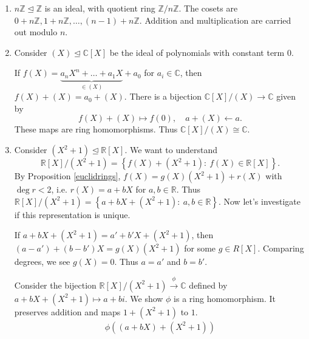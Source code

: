 \documentclass[a4paper]{scrartcl}
\begin{document}
\begin{example*}
       \begin{enumerate}
             \item $n\mathbb{Z} \unlhd \mathbb{Z}$ is an ideal, with quotient ring $\mathbb{Z}/n\mathbb{Z}$. The cosets are $0+n\mathbb{Z}, 1+n\mathbb{Z}, \ldots, (n-1)+n\mathbb{Z}$. Addition and multiplication are carried out modulo $n$.
             \item Consider $(X) \unlhd \mathbb{C}[X]$ be the ideal of polynomials with constant term 0.
             
             If $f (X)=\underbrace{a_{n}X^{n}+\ldots+ a_1 X}_{\in (X)} +a_0 $ for $a_{i}\in \mathbb{C}$, then $f (X)+(X)=a_0 +(X)$. There is a bijection $\mathbb{C}[X]/(X) \rightarrow \mathbb{C}$ given by \[
             f (X)+(X) \mapsto f (0), \quad a+(X) \leftarrow a
             .\] These maps are ring homomorphisms. Thus $\mathbb{C}[X]/(X) \cong \mathbb{C}$.
             \item Consider $(X^2+1) \unlhd \mathbb{R}[X]$. We want to understand \[
                  \mathbb{R}[X]/(X^2+1)=\left\{f (X)+(X^2+1): \ f (X)\in \mathbb{R}[X]\right\}
             .\] By Proposition \ref{euclidrings}, $f (X)=g (X)(X^2+1)+r (X)$ with $\operatorname{deg}r <2$, i.e. $r (X)=a+bX$ for $a,b \in \mathbb{R}$. Thus $\mathbb{R}[X]/(X^2+1)=\left\{a+bX+(X^2+1): \ a,b \in \mathbb{R}\right\}$. Now let's investigate if this representation is unique. 

             If $a+bX + (X^2+1)= a' +b'X +(X^2+1)$, then $(a-a')+ (b-b')X = g (X)(X^2+1)$ for some $g \in R[X]$. Comparing degrees, we see $g (X)=0$. Thus $a=a'$ and $b=b'$.
             
             Consider the bijection $\mathbb{R}[X]/(X^2+1) \overset{\phi}{\rightarrow }\mathbb{C}$ defined by $a+bX+ (X^2+1)\mapsto a+bi$. We show $\phi$ is a ring homomorphism. It preserves addition and maps $1+ (X^2+1)$ to $1$.
             \begin{align*}
                   \phi ((a+bX)+(X^2+1))
             \end{align*}
       \end{enumerate}
\end{example*}
\end{document}

